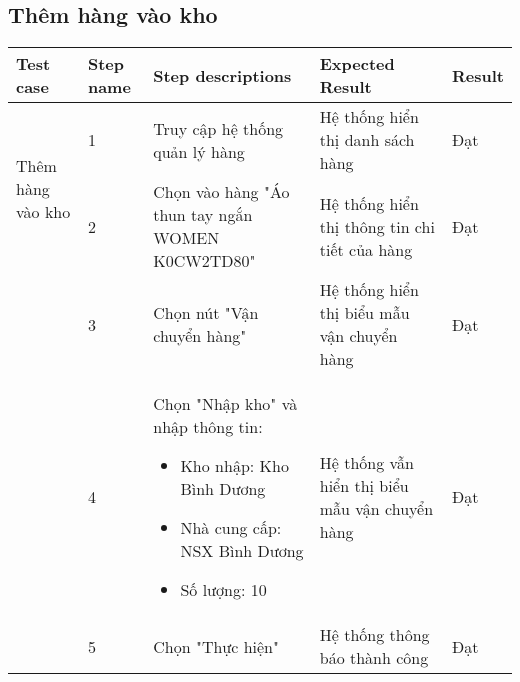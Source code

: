 \subsection{Thêm hàng vào kho}
{
    \setlength\extrarowheight{6pt}
    \begin{longtable}{| p{2.5cm}| p{1cm}| p{5.5cm}| p{4.5cm} | p{1.5cm} |}
        \hline
        \textbf{Test case} & \textbf{Step name} & \textbf{Step descriptions} & \textbf{Expected Result} & \textbf{Result} \\
        \hline
        \multirow[t]{2}{2.5cm}{Thêm hàng vào kho} & 1 & Truy cập hệ thống quản lý hàng & Hệ thống hiển thị danh sách hàng & Đạt \\
        \cline{2-5}
         & 2 & Chọn vào hàng "Áo thun tay ngắn WOMEN K0CW2TD80" & Hệ thống hiển thị thông tin chi tiết của hàng & Đạt \\
        \cline{2-5}
        & 3 & Chọn nút "Vận chuyển hàng" & Hệ thống hiển thị biểu mẫu vận chuyển hàng & Đạt \\
        \cline{2-5}
         & 4 & Chọn "Nhập kho" và nhập thông tin:
         \begin{itemize}
            \item Kho nhập: Kho Bình Dương
            \item Nhà cung cấp: NSX Bình Dương
            \item Số lượng: 10
         \end{itemize}
         & Hệ thống vẫn hiển thị biểu mẫu vận chuyển hàng & Đạt \\
         \cline{2-5}
         & 5 & Chọn "Thực hiện" & Hệ thống thông báo thành công & Đạt \\
        \hline
    \end{longtable} 
}


